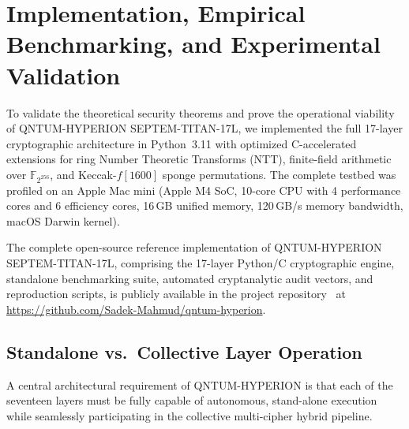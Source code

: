 \documentclass{ieeeaccess}
\newcommand{\F}{\mathbb{F}}
\begin{document}
\section{Implementation, Empirical Benchmarking, and Experimental Validation}
\label{sec:experiments}

To validate the theoretical security theorems and prove the operational viability of \textsc{QNTUM-HYPERION SEPTEM-TITAN-17L}, we implemented the full 17-layer cryptographic architecture in Python~3.11 with optimized C-accelerated extensions for ring Number Theoretic Transforms (NTT), finite-field arithmetic over $\F_{2^{256}}$, and Keccak-$f[1600]$ sponge permutations. The complete testbed was profiled on an Apple Mac mini (Apple M4 SoC, 10-core CPU with 4 performance cores and 6 efficiency cores, 16\,GB unified memory, 120\,GB/s memory bandwidth, macOS Darwin kernel).

The complete open-source reference implementation of \textsc{QNTUM-HYPERION SEPTEM-TITAN-17L}, comprising the 17-layer Python/C cryptographic engine, standalone benchmarking suite, automated cryptanalytic audit vectors, and reproduction scripts, is publicly available in the project repository~\cite{mahmud2026hyperion_repo} at \url{https://github.com/Sadek-Mahmud/qntum-hyperion}.

\subsection{Standalone vs.\ Collective Layer Operation}
A central architectural requirement of \textsc{QNTUM-HYPERION} is that each of the seventeen layers must be fully capable of autonomous, stand-alone execution while seamlessly participating in the collective multi-cipher hybrid pipeline.
\end{document}
